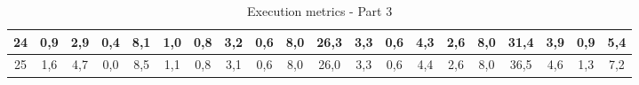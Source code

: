 \begin{sidewaystable}[]
\begin{tabular}{|c|c|c|c|c|c|c|c|c|c|c|c|c|c|c|c|c|c|c|c|}
    24 & 0,9                                             & 2,9                                             & 0,4                                             & 8,1                                              & 1,0                                              & 0,8                                              & 3,2                                              & 0,6                                              & 8,0                                              & 26,3                                             & 3,3                                              & 0,6                                              & 4,3                                              & 2,6                                              & 8,0                                              & 31,4                                             & 3,9                                              & 0,9                                              & 5,4                                              \\ \hline
    25 & 1,6                                             & 4,7                                             & 0,0                                             & 8,5                                              & 1,1                                              & 0,8                                              & 3,1                                              & 0,6                                              & 8,0                                              & 26,0                                             & 3,3                                              & 0,6                                              & 4,4                                              & 2,6                                              & 8,0                                              & 36,5                                             & 4,6                                              & 1,3                                              & 7,2                                              \\ \hline
    \end{tabular}
    \caption{Execution metrics - Part 3}
    \label{tab:ap:exec_metrics_3}
\end{sidewaystable}

